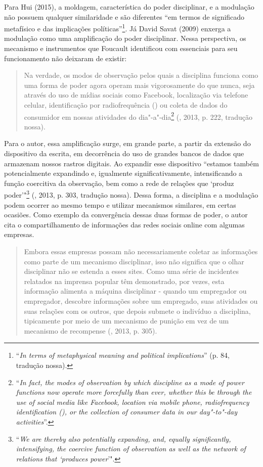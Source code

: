Para Hui (2015), a moldagem, característica do poder disciplinar, e a modulação não
possuem qualquer similaridade e são diferentes ``em termos de
significado metafísico e das implicações políticas''\footnote{``\emph{In terms
  of metaphysical meaning and political implications}'' (p. 84, tradução
nossa).}. Já David Savat (2009) enxerga a modulação como uma amplificação do poder disciplinar. Nessa perspectiva, os mecanismo e instrumentos que Foucault identificou com
essenciais para seu funcionamento não deixaram de existir:

\begin{quote}
Na verdade, os modos de observação pelos quais a disciplina funciona
como uma forma de poder agora operam mais vigorosamente do que nunca,
seja através do uso de mídias sociais como Facebook, localização  via
telefone celular, identificação por radiofrequência () ou coleta de
dados do consumidor em nossas atividades do dia"-a"-dia\footnote{``\emph{In
  fact, the modes of observation by which discipline as a mode of power
  functions now operate more forcefully than ever, whether this be
  through the use of social media like Facebook,  location via mobile
  phone, radiofrequency identification (), or the collection of
  consumer data in our day"-to"-day activities}''.} (, 2013, p. 222, tradução nossa). 
\end{quote}

Para o autor, essa amplificação surge, em grande parte, a partir da
extensão do dispositivo da escrita, em decorrência do uso de grandes
bancos de dados que armazenam nossos rastros digitais. Ao expandir esse
dispositivo ``estamos também potencialmente expandindo e, igualmente
significativamente, intensificando a função coercitiva da observação,
bem como a rede de relações que `produz poder'"\footnote{``\emph{We are
  thereby also potentially expanding, and, equally significantly,
  intensifying, the coercive function of observation as well as the
  network of relations that `produces power}'".}
(, 2013, p. 303, tradução nossa).
Dessa forma, a disciplina e a modulação podem ocorrer ao mesmo tempo e
utilizar mecanismos similares, em certas ocasiões. Como exemplo da
convergência dessas duas formas de poder, o autor cita o
compartilhamento de informações das redes sociais online com algumas
empresas.

\begin{quote}
Embora essas empresas possam não necessariamente coletar as informações
como parte de um mecanismo disciplinar, isso não significa que o olhar
disciplinar não se estenda a esses sites. Como uma série de incidentes
relatados na imprensa popular têm demonstrado, por vezes, esta
informação alimenta a máquina disciplinar - quando um empregador ou
empregador, descobre informações sobre um empregado, suas atividades ou
suas relações com os outros, que depois submete o indivíduo a
disciplina, tipicamente por meio de um mecanismo de punição em vez de um
mecanismo de recompense (, 2013, p. 305).
\end{quote}

